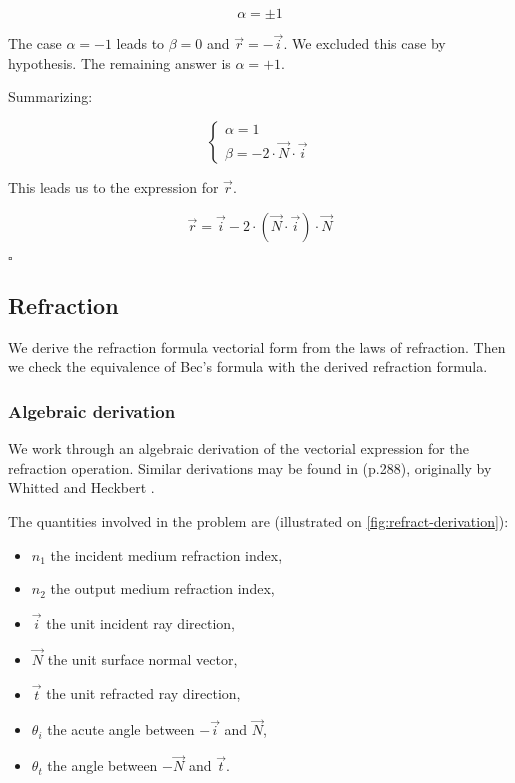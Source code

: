 \begin{equation}
\alpha = \pm 1
\end{equation}

The case $\alpha = -1$ leads to $\beta = 0$ and $\overrightarrow{r} = -
\overrightarrow{i}$. We excluded this case by hypothesis.  The remaining answer
is $\alpha = + 1$.

Summarizing:

\begin{equation} \begin{cases}
\alpha = 1 \\
\beta = -2 \cdot \overrightarrow{N} \cdot \overrightarrow{i}
\end{cases} \end{equation}

This leads us to the expression for $\overrightarrow{r}$.

\begin{equation}
\overrightarrow{r} = \overrightarrow{i} - 2 \cdot (\overrightarrow{N} \cdot
\overrightarrow{i}) \cdot \overrightarrow{N}
\end{equation}

$\square$

\subsection{Refraction}
We derive the refraction formula vectorial form from the laws of refraction.
Then we check the equivalence of Bec's formula with the derived refraction
formula.

\subsubsection{Algebraic derivation}
We work through an algebraic derivation of the vectorial expression for
the refraction operation. Similar derivations may be found in
\cite{Glassner:1989} (p.288), originally by Whitted \cite{Whitted:2005}
and Heckbert \cite{Heckbert:1984}.

The quantities involved in the problem are (illustrated on
\cref{fig:refract-derivation}):

\begin{itemize}
\item $n_1$ the incident medium refraction index,
\item $n_2$ the output medium refraction index,
\item $\overrightarrow{i}$ the unit incident ray direction,
\item $\overrightarrow{N}$ the unit surface normal vector,
\item $\overrightarrow{t}$ the unit refracted ray direction,
\item $\theta_i$ the acute angle between $-\overrightarrow{i}$
and $\overrightarrow{N}$,
\item $\theta_t$ the angle between $-\overrightarrow{N}$ and
$\overrightarrow{t}$.
\end{itemize}

